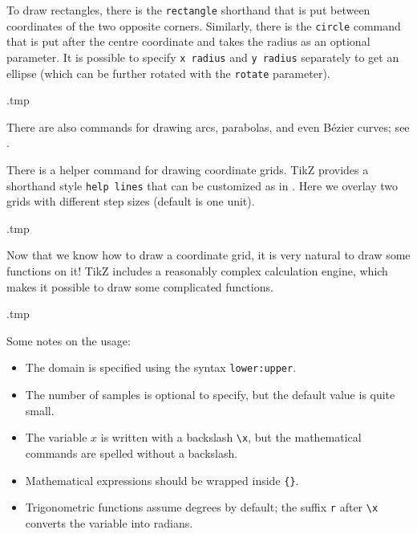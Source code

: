 To draw rectangles, there is the \verb|rectangle| shorthand
that is put between coordinates of the two opposite corners.
Similarly, there is the \verb|circle| command that is put after the centre coordinate
and takes the radius as an optional parameter.
It is possible to specify \verb|x radius| and \verb|y radius| separately to get an ellipse
(which can be further rotated with the \verb|rotate| parameter).
%
\begin{VerbatimOut}{\jobname.tmp}
\end{VerbatimOut}
\ShowExample

There are also commands for drawing arcs, parabolas, and even Bézier curves;
see \cite[Section~14]{tikz}.

There is a helper command for drawing coordinate grids.
TikZ provides a shorthand style \verb|help lines|
that can be customized as in .
Here we overlay two grids with different step sizes (default is one unit).
%
\begin{VerbatimOut}{\jobname.tmp}
\centering
{}
\end{VerbatimOut}
\ShowExampleBelow[2]

Now that we know how to draw a coordinate grid,
it is very natural to draw some functions on it!
TikZ includes a reasonably complex calculation engine,
which makes it possible to draw some complicated functions.
%
\begin{VerbatimOut}{\jobname.tmp}
\centering
{}
\end{VerbatimOut}
\ShowExampleBelow[2]
Some notes on the usage:
\begin{itemize}
\item The domain is specified using the syntax \verb|lower:upper|.
\item The number of samples is optional to specify, but the default value is quite small.
\item The variable $x$ is written with a backslash \verb|\x|,
    but the mathematical commands are spelled without a backslash.
\item Mathematical expressions should be wrapped inside \verb|{}|.
\item Trigonometric functions assume degrees by default;
    the suffix \verb|r| after \verb|\x| converts the variable into radians.
\end{itemize}

